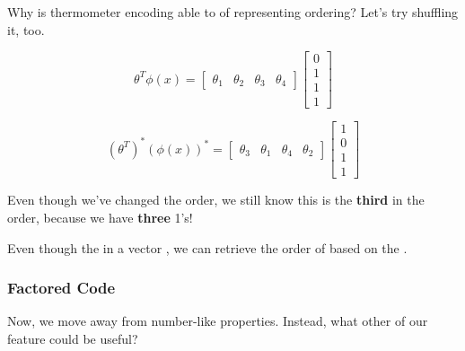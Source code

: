                 Why is thermometer encoding able to of representing ordering? Let's try shuffling it, too.

                \begin{equation}
                    \theta^T \phi(x) = 
                    \begin{bmatrix}
                        \theta_1 & \theta_2 & \theta_3 & \theta_4
                    \end{bmatrix}
                    \begin{bmatrix}
                        0\\1\\1\\1
                    \end{bmatrix}
                \end{equation}

                \begin{equation}
                    (\theta^T)^* (\phi(x))^* = 
                    \begin{bmatrix}
                        \theta_3 & \theta_1 & \theta_4 & \theta_2
                    \end{bmatrix}
                    \begin{bmatrix}
                        1 \\ 0 \\ 1 \\ 1
                    \end{bmatrix}
                \end{equation}

                Even though we've changed the order, we still know this is the \textbf{third} in the order, because we have \textbf{three} 1's!\\

                \begin{concept}
                    Even though the  in a vector , we can retrieve the order of  based on the .
                \end{concept}
            
            \subsecdiv
            \subsubsection{Factored Code}

                Now, we move away from number-like properties. Instead, what other  of our feature could be useful?

